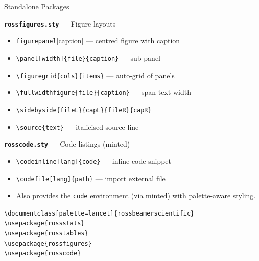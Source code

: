 \documentclass[palette=lancet]{rossbeamerscientific}
\newcommand{\cmd}[1]{\texttt{\color{rbAccent}\textbackslash #1}}
\newcommand{\env}[1]{\texttt{\color{rbSecondary}#1}}
\newcommand{\pkg}[1]{\texttt{\color{rbSecondary}\bfseries #1}}
\begin{document}
\begin{frame}{Standalone Packages}
\begin{twocol}
\colbreak
  \textbf{\pkg{rossfigures.sty}} --- Figure layouts
  \begin{itemize}\setlength\itemsep{0pt}
    \item \env{figurepanel}[caption] --- centred figure with caption
    \item \cmd{panel[width]\{file\}\{caption\}} --- sub-panel
    \item \cmd{figuregrid\{cols\}\{items\}} --- auto-grid of panels
    \item \cmd{fullwidthfigure\{file\}\{caption\}} --- span text width
    \item \cmd{sidebyside\{fileL\}\{capL\}\{fileR\}\{capR\}}
    \item \cmd{source\{text\}} --- italicised source line
  \end{itemize}
  \vskip6pt

  \textbf{\pkg{rosscode.sty}} --- Code listings (minted)
  \begin{itemize}\setlength\itemsep{0pt}
    \item \cmd{codeinline[lang]\{code\}} --- inline code snippet
    \item \cmd{codefile[lang]\{path\}} --- import external file
    \item Also provides the \env{code} environment (via minted)
      with palette-aware styling.
  \end{itemize}
  \vskip10pt

  \begin{card}[title={Quick Start}]
    \scriptsize
    \texttt{\textbackslash documentclass[palette=lancet]\{rossbeamerscientific\}}\\
    \texttt{\textbackslash usepackage\{rossstats\}} \\
    \texttt{\textbackslash usepackage\{rosstables\}}\\
    \texttt{\textbackslash usepackage\{rossfigures\}}\\
    \texttt{\textbackslash usepackage\{rosscode\}} 
  \end{card}
\end{twocol}
\end{frame}
\end{document}
